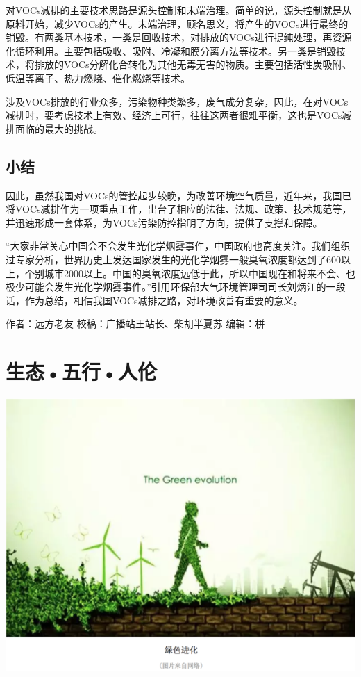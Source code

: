 \documentclass[]{book}
\begin{document}
对VOCs减排的主要技术思路是源头控制和末端治理。简单的说，源头控制就是从原料开始，减少VOCs的产生。末端治理，顾名思义，将产生的VOCs进行最终的销毁。有两类基本技术，一类是回收技术，对排放的VOCs进行提纯处理，再资源化循环利用。主要包括吸收、吸附、冷凝和膜分离方法等技术。另一类是销毁技术，将排放的VOCs分解化合转化为其他无毒无害的物质。主要包括活性炭吸附、低温等离子、热力燃烧、催化燃烧等技术。

涉及VOCs排放的行业众多，污染物种类繁多，废气成分复杂，因此，在对VOCs减排时，要考虑技术上有效、经济上可行，往往这两者很难平衡，这也是VOCs减排面临的最大的挑战。

\hypertarget{ux5c0fux7ed3-1}{%
\subsection{小结}\label{ux5c0fux7ed3-1}}

因此，虽然我国对VOCs的管控起步较晚，为改善环境空气质量，近年来，我国已将VOCs减排作为一项重点工作，出台了相应的法律、法规、政策、技术规范等，并迅速形成一套体系，为VOCs污染防控指明了方向，提供了支撑和保障。

``大家非常关心中国会不会发生光化学烟雾事件，中国政府也高度关注。我们组织过专家分析，世界历史上发达国家发生的光化学烟雾一般臭氧浓度都达到了600以上，个别城市2000以上。中国的臭氧浓度远低于此，所以中国现在和将来不会、也极少可能会发生光化学烟雾事件。''引用环保部大气环境管理司司长刘炳江的一段话，作为总结，相信我国VOCs减排之路，对环境改善有重要的意义。

作者：远方老友
校稿：广播站王站长、柴胡半夏苏
编辑：栟

\hypertarget{ux751fux6001ux4e94ux884cux4ebaux4f26}{%
\section{生态•五行•人伦}\label{ux751fux6001ux4e94ux884cux4ebaux4f26}}

\includegraphics[width=8.33in]{images/swr1}
\end{document}
